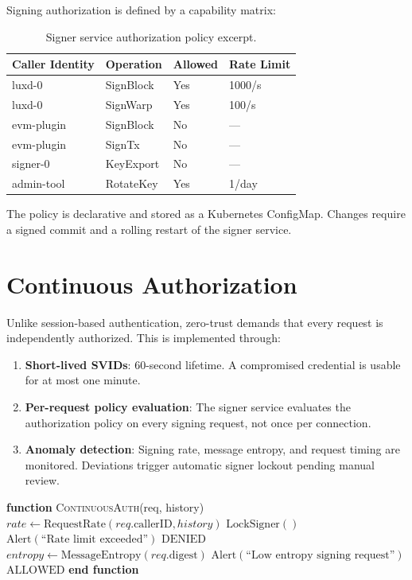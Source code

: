 \documentclass[11pt]{article}
\begin{document}
Signing authorization is defined by a capability matrix:

\begin{table}[h]
\centering
\small
\begin{tabular}{@{}llll@{}}
\toprule
\textbf{Caller Identity} & \textbf{Operation} & \textbf{Allowed} & \textbf{Rate Limit} \\
\midrule
luxd-0 & SignBlock & Yes & 1000/s \\
luxd-0 & SignWarp & Yes & 100/s \\
evm-plugin & SignBlock & No & --- \\
evm-plugin & SignTx & No & --- \\
signer-0 & KeyExport & No & --- \\
admin-tool & RotateKey & Yes & 1/day \\
\bottomrule
\end{tabular}
\caption{Signer service authorization policy excerpt.}
\label{tab:signer-policy}
\end{table}

The policy is declarative and stored as a Kubernetes ConfigMap. Changes require a signed commit and a rolling restart of the signer service.

\section{Continuous Authorization}

Unlike session-based authentication, zero-trust demands that every request is independently authorized. This is implemented through:

\begin{enumerate}
\item \textbf{Short-lived SVIDs}: 60-second lifetime. A compromised credential is usable for at most one minute.
\item \textbf{Per-request policy evaluation}: The signer service evaluates the authorization policy on every signing request, not once per connection.
\item \textbf{Anomaly detection}: Signing rate, message entropy, and request timing are monitored. Deviations trigger automatic signer lockout pending manual review.
\end{enumerate}

\begin{algorithmic}[1]
\State \textbf{function} \textsc{ContinuousAuth}(req, history)
\State $rate \gets \text{RequestRate}(req.\text{callerID}, history)$
    \State $\text{LockSigner}()$
    \State $\text{Alert}(\text{``Rate limit exceeded''})$
    \State \Return $\text{DENIED}$
\EndIf
\State $entropy \gets \text{MessageEntropy}(req.\text{digest})$
    \State $\text{Alert}(\text{``Low entropy signing request''})$
\EndIf
\State \Return $\text{ALLOWED}$
\State \textbf{end function}
\end{algorithmic}
\end{document}
